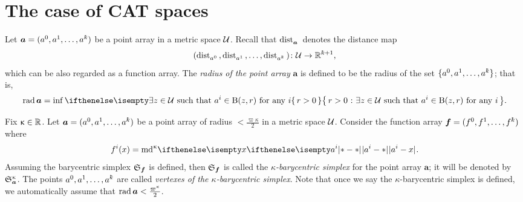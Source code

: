 \section{The case of CAT spaces}

Let $\bm{a}=(a^0,a^1,\dots,a^\kay)$ be a point array in a metric space $\mathcal{U}$.
Recall that 
$\mathop{\rm dist}\nolimits_{\bm{a}}^{{}}{}{}$
denotes the distance map
\[(\distfun{a^0}{}{},\distfun{a^1}{}{},\dots,\distfun{a^\kay}{}{})\:\spc{U}\to\RR^{\kay+1},\]
which can be also regarded as a function array.
The \emph{radius of the point array} $\bm{a}$ is defined to be the radius of the set $\{a^0,a^1,\dots,a^\kay\}$;
that is,
\[\rad\bm{a}=\inf\set{r>0}{\exists z\in\spc{U}\ \text{such that}\ a^i\in \oBall(z,r)\ \text{for any}\ i}.\]

Fix $\kappa\in\RR$.
Let $\bm{a}=(a^0,a^1,\dots,a^\kay)$ be a point array of radius $<\tfrac{\varpi\kappa}2$
in a metric space $\mathcal{U}$.
Consider the function array $\bm{f}=(f^0,f^1,\dots,f^\kay)$ 
where 
\[f^i(x)\z=\md\kappa\dist[{{}}]{a^i}{x}{}.\]
Assuming the barycentric simplex $\mathfrak{S}_{\bm{f}}$ is defined,
then $\mathfrak{S}_{\bm{f}}$ is called the \emph{$\kappa$-barycentric simplex} for the point array $\bm{a}$;
it will be denoted by $\mathfrak{S}_{\bm{a}}^{\upkappa}$.
The points $a^0,a^1,\dots,a^\kay$ are called 
\emph{vertexes of the $\kappa$-barycentric simplex}.
Note that once we say the $\kappa$-barycentric simplex is defined, 
we automatically assume that $\rad\bm{a}<\tfrac{\varpi\kappa}2$.


